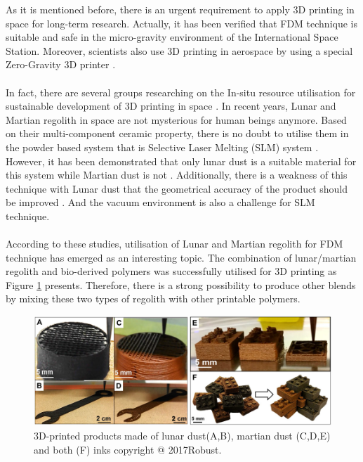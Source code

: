 As it is mentioned before, there is an urgent requirement to apply 3D printing in space for long-term research. Actually, it has been verified that FDM technique is suitable and safe in the micro-gravity environment of the International Space Station\cite{fateriadditive}. Moreover, scientists also use 3D printing in aerospace by using a special Zero-Gravity 3D printer \cite{joshi20153d}. \\
\\
In fact, there are several groups researching on the In-situ resource utilisation for sustainable development of 3D printing in space \cite{kading2015utilizing}. In recent years, Lunar and Martian regolith in space are not mysterious for human beings anymore. Based on their multi-component ceramic property, there is no doubt to utilise them in the powder based system that is Selective Laser Melting (SLM) system \cite{goulas20163d}. However, it has been demonstrated that only lunar dust is a suitable material for this system while Martian dust is not \cite{goulas2017assessing}.  Additionally, there is a weakness of this technique with Lunar dust that the geometrical accuracy of the product should be improved \cite{fateriadditive}. And the vacuum environment is also a challenge for SLM technique.\\
\\ 
According to these studies, utilisation of Lunar and Martian regolith for FDM technique has emerged as an interesting topic. The combination of lunar/martian regolith and bio-derived polymers was successfully utilised for 3D printing \cite{jakus2017robust} as Figure \ref{Fig:lUNAR PRITNS} presents. Therefore, there is a strong possibility to produce other blends by mixing these two types of regolith with other printable polymers\cite{ray2010jsc}. 
 \\
 
\begin{figure}[htbp]
  \centering
  \includegraphics[scale=0.5]{Figs//LUNAR_dust_prints.PNG}
  \caption[3D-printed products made of Lunar/Mars dust]{\footnotesize 3D-printed products made of lunar dust(A,B), martian dust (C,D,E) and both (F) inks copyright @ 2017Robust. }
  \label{Fig:lUNAR PRITNS}
\end{figure}

